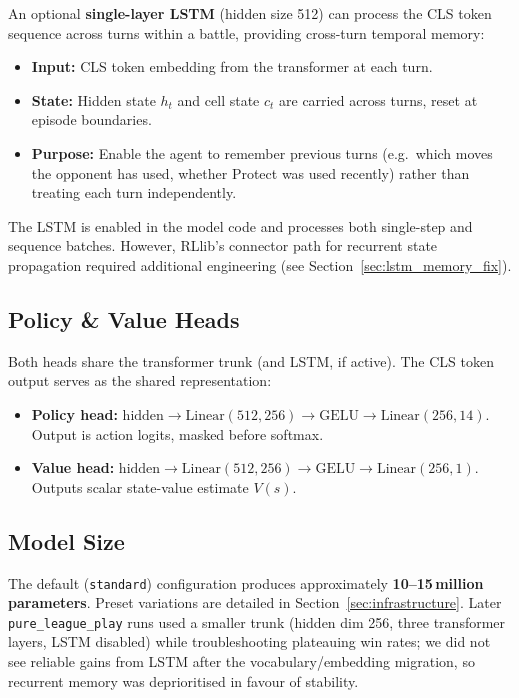 An optional \textbf{single-layer LSTM} (hidden size 512) can process the CLS
token sequence across turns within a battle, providing cross-turn temporal
memory:

\begin{itemize}
  \item \textbf{Input:} CLS token embedding from the transformer at each turn.
  \item \textbf{State:} Hidden state $h_t$ and cell state $c_t$ are carried
        across turns, reset at episode boundaries.
  \item \textbf{Purpose:} Enable the agent to remember previous turns (e.g.\
        which moves the opponent has used, whether Protect was used recently)
        rather than treating each turn independently.
\end{itemize}

The LSTM is enabled in the model code and processes both single-step and
sequence batches.  However, RLlib's connector path for recurrent state
propagation required additional engineering (see
Section~\ref{sec:lstm_memory_fix}).

\subsection{Policy \& Value Heads}

Both heads share the transformer trunk (and LSTM, if active).  The CLS token
output serves as the shared representation:

\begin{itemize}
  \item \textbf{Policy head:} $\text{hidden} \to \text{Linear}(512, 256) \to
        \text{GELU} \to \text{Linear}(256, 14)$.  Output is action logits,
        masked before softmax.
  \item \textbf{Value head:} $\text{hidden} \to \text{Linear}(512, 256) \to
        \text{GELU} \to \text{Linear}(256, 1)$.  Outputs scalar state-value
        estimate $V(s)$.
\end{itemize}

\subsection{Model Size}

The default (\texttt{standard}) configuration produces approximately
\textbf{10--15\,million parameters}.  Preset variations are detailed in
Section~\ref{sec:infrastructure}.
Later \texttt{pure\_league\_play} runs used a smaller trunk (hidden dim 256,
three transformer layers, LSTM disabled) while troubleshooting plateauing win
rates; we did not see reliable gains from LSTM after the vocabulary/embedding
migration, so recurrent memory was deprioritised in favour of stability.



